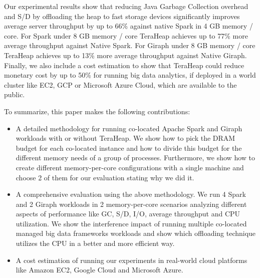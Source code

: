 Our experimental results show that reducing Java Garbage Collection
overhead and S/D by offloading the heap to fast storage devices significantly
improves average server throughput by up to 66\% against native Spark in 4 GB memory / core. 
For Spark under 8 GB memory / core TeraHeap achieves up to 77\% more average throughput against Native Spark.
For Giraph under 8 GB memory / core TeraHeap achieves up to 13\% more average throughput against Native Giraph.
Finally, we also include a cost estimation to show that
TeraHeap could reduce monetary cost by up to 50\% for running big data
analytics, if deployed in a world cluster like EC2, GCP or Microsoft Azure Cloud, which are available to
the public.

To summarize, this paper makes the following contributions: 
\begin{itemize}
    \item{A detailed methodology for running co-located Apache Spark and Giraph
        workloads with or without TeraHeap. 
	We show how to pick the DRAM budget for each co-located instance and how to divide this budget
		for the different memory needs of a group of processes.
		Furthermore, we show how to create different memory-per-core configurations with a single machine and choose
		2 of them for our evaluation stating why we did it.
		}

    \item{A comprehensive evaluation using the above methodology.
	    We run 4 Spark and 2 Giraph workloads in 2 memory-per-core scenarios
	    analyzing different aspects of performance like GC, S/D, I/O, average throughput
		and CPU utilization. We show the interference impact of running multiple co-located managed big data frameworks
		workloads and show which offloading technique utilizes the CPU in a better and more efficient way.}

    \item{A cost estimation of running our experiments in real-world
        cloud platforms like Amazon EC2, Google Cloud and Microsoft
        Azure.}
\end{itemize}
